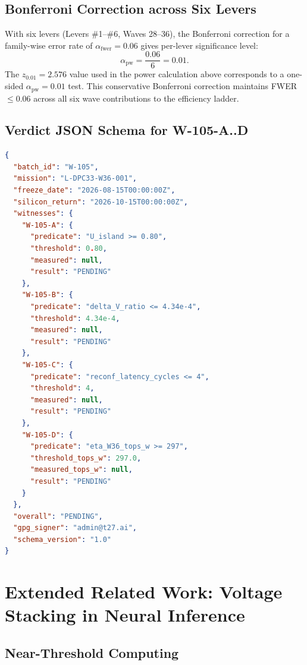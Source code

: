 \subsection{Bonferroni Correction across Six Levers}

With six levers (Levers \#1--\#6, Waves 28--36), the Bonferroni
correction for a family-wise error rate of $\alpha_\mathrm{fwer} = 0.06$
gives per-lever significance level:
\[
  \alpha_\mathrm{pw} = \frac{0.06}{6} = 0.01.
\]
The $z_{0.01} = 2.576$ value used in the power calculation above
corresponds to a one-sided $\alpha_\mathrm{pw} = 0.01$ test.
This conservative Bonferroni correction maintains FWER $\leq 0.06$
across all six wave contributions to the efficiency ladder.

\subsection{Verdict JSON Schema for W-105-A..D}

\begin{lstlisting}[language=json, caption={W-105 verdict JSON schema (all four predicates)}]
{
  "batch_id": "W-105",
  "mission": "L-DPC33-W36-001",
  "freeze_date": "2026-08-15T00:00:00Z",
  "silicon_return": "2026-10-15T00:00:00Z",
  "witnesses": {
    "W-105-A": {
      "predicate": "U_island >= 0.80",
      "threshold": 0.80,
      "measured": null,
      "result": "PENDING"
    },
    "W-105-B": {
      "predicate": "delta_V_ratio <= 4.34e-4",
      "threshold": 4.34e-4,
      "measured": null,
      "result": "PENDING"
    },
    "W-105-C": {
      "predicate": "reconf_latency_cycles <= 4",
      "threshold": 4,
      "measured": null,
      "result": "PENDING"
    },
    "W-105-D": {
      "predicate": "eta_W36_tops_w >= 297",
      "threshold_tops_w": 297.0,
      "measured_tops_w": null,
      "result": "PENDING"
    }
  },
  "overall": "PENDING",
  "gpg_signer": "admin@t27.ai",
  "schema_version": "1.0"
}
\end{lstlisting}

\section{Extended Related Work: Voltage Stacking in Neural Inference}
\label{app:related_extended}

\subsection{Near-Threshold Computing}

